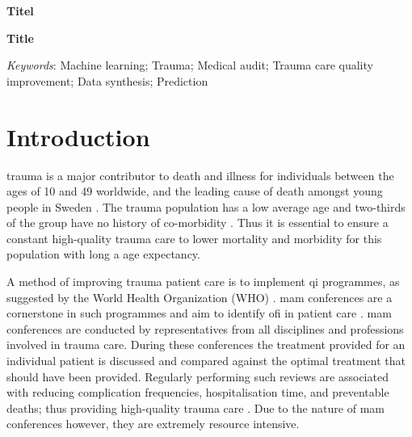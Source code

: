 \documentclass[12pt, letterpaper]{article}
\begin{document}
\begin{titlepage}
    
\end{titlepage}


\textbf{Titel}

\lipsum[1]

\vfill

\textbf{Title}

\lipsum[1]

\vfill

\textit{Keywords}: Machine learning; Trauma; Medical audit; Trauma care quality improvement; Data synthesis; Prediction

\newpage

\glsaddall
\printnoidxglossary[type=acronym,style=csuper]
\printnoidxglossary[style=gsuper]

\newpage
{}


\section{Introduction}
\Gls{trauma} is a major contributor to death and illness for individuals between the ages of 10 and 49 worldwide, and the leading cause of death amongst young people in Sweden \cite{roth_global_2018, vos_global_2020, sos_death_2021}. The \gls{trauma} population has a low average age and two-thirds of the group have no history of co-morbidity \cite{brattstrom_socio-economic_2015}. Thus it is essential to ensure a constant high-quality \gls{trauma} care to lower mortality and morbidity for this population with long a age expectancy.

A method of improving trauma patient care is to implement \acrfull{qi} programmes, as suggested by the World Health Organization (WHO) \cite{world_health_organization_guidelines_2009}. \Acrfull{mam} conferences are a cornerstone in such programmes and aim to identify \acrfull{ofi} in patient care \cite{santana_development_2014}. \acrshort{mam} conferences are conducted by representatives from all disciplines and professions involved in trauma care. During these conferences the treatment provided for an individual patient is discussed and compared against the optimal treatment that should have been provided. Regularly performing such reviews are associated with reducing complication frequencies, hospitalisation time, and preventable deaths; thus providing high-quality trauma care \cite{stelfox_evidence_2011, mcdermott_trauma_1994}. Due to the nature of \acrshort{mam} conferences however, they are extremely resource intensive.
\end{document}
